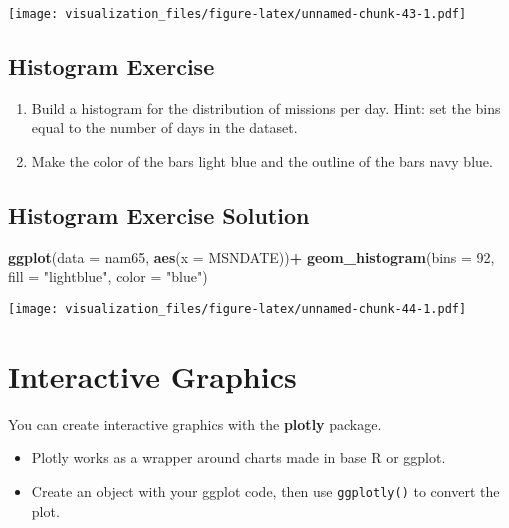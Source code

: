 \documentclass[oneside]{memoir}
\newenvironment{Shaded}{\begin{snugshade}}{\end{snugshade}}
\newcommand{\KeywordTok}[1]{\textcolor[rgb]{0.13,0.29,0.53}{\textbf{#1}}}
\newcommand{\DataTypeTok}[1]{\textcolor[rgb]{0.13,0.29,0.53}{#1}}
\newcommand{\DecValTok}[1]{\textcolor[rgb]{0.00,0.00,0.81}{#1}}
\newcommand{\StringTok}[1]{\textcolor[rgb]{0.31,0.60,0.02}{#1}}
\newcommand{\OperatorTok}[1]{\textcolor[rgb]{0.81,0.36,0.00}{\textbf{#1}}}
\newcommand{\NormalTok}[1]{#1}
\theoremstyle{definition}
\theoremstyle{definition}
\theoremstyle{definition}
\theoremstyle{remark}
\begin{document}
\texttt{[image: visualization\_files/figure-latex/unnamed-chunk-43-1.pdf]}

\section{Histogram Exercise}\label{histogram-exercise}

\begin{enumerate}
\def\labelenumi{\arabic{enumi}.}
\item
  Build a histogram for the distribution of missions per day. Hint: set
  the bins equal to the number of days in the dataset.
\item
  Make the color of the bars light blue and the outline of the bars navy
  blue.
\end{enumerate}

\section{Histogram Exercise Solution}\label{histogram-exercise-solution}

\begin{Shaded}
\begin{Highlighting}[]
\KeywordTok{ggplot}\NormalTok{(}\DataTypeTok{data =}\NormalTok{ nam65, }\KeywordTok{aes}\NormalTok{(}\DataTypeTok{x =}\NormalTok{ MSNDATE))}\OperatorTok{+}
\StringTok{  }\KeywordTok{geom_histogram}\NormalTok{(}\DataTypeTok{bins =} \DecValTok{92}\NormalTok{, }\DataTypeTok{fill =} \StringTok{"lightblue"}\NormalTok{, }\DataTypeTok{color =} \StringTok{"blue"}\NormalTok{)}
\end{Highlighting}
\end{Shaded}

\texttt{[image: visualization\_files/figure-latex/unnamed-chunk-44-1.pdf]}

\chapter{Interactive Graphics}\label{interactive-graphics}

You can create interactive graphics with the \textbf{plotly} package.

\begin{itemize}
\item
  Plotly works as a wrapper around charts made in base R or ggplot.
\item
  Create an object with your ggplot code, then use \texttt{ggplotly()}
  to convert the plot.
\end{itemize}
\end{document}

